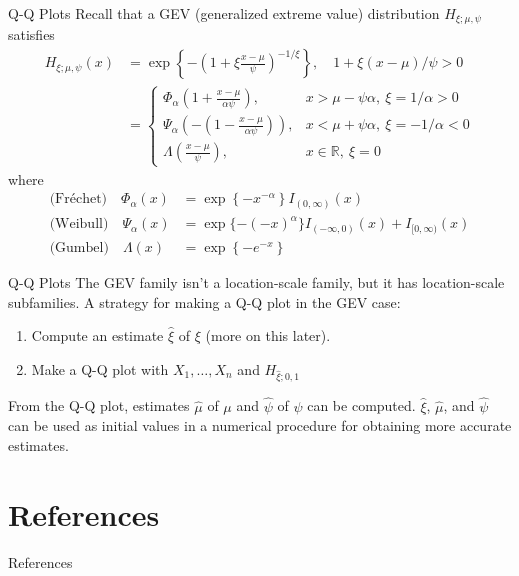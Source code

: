 \documentclass{beamer}
\begin{document}
\begin{frame}{Q-Q Plots}
    Recall that a GEV (generalized extreme value) distribution $H_{\xi; \mu, \psi}$ satisfies
    \begin{align*}
        H_{\xi; \mu, \psi}(x) &= \exp\left\{-\left(1 + \xi\frac{x - \mu}{\psi}\right)^{-1 / \xi}\right\}, \quad 1 + \xi(x - \mu) / \psi > 0 \\
        &=
        \begin{cases}
            \Phi_{\alpha}\left(1 + \frac{x - \mu}{\alpha\psi}\right), & x > \mu - \psi\alpha, \ \xi = 1 / \alpha > 0 \\
            \Psi_{\alpha}\left(-\left(1 - \frac{x - \mu}{\alpha\psi}\right)\right), & x < \mu + \psi\alpha, \ \xi = -1 / \alpha < 0 \\
            \Lambda\left(\frac{x - \mu}{\psi}\right), & x \in \mathbb{R}, \ \xi = 0
        \end{cases}
    \end{align*}
    where
    \begin{align*}
        \text{(Fr\'{e}chet)} \quad \Phi_{\alpha}(x) &= \exp\left\{-x^{-\alpha}\right\}I_{(0, \infty)}(x) \\
        \text{(Weibull)} \quad \Psi_{\alpha}(x) &= \exp\{-(-x)^{\alpha}\}I_{(-\infty, 0)}(x) + I_{[0, \infty)}(x) \\
        \text{(Gumbel)} \quad \Lambda(x) &= \exp\left\{-e^{-x}\right\}
    \end{align*}
\end{frame}

\begin{frame}{Q-Q Plots}
    The GEV family isn't a location-scale family, but it has location-scale subfamilies. A strategy for making a Q-Q plot in the GEV case:
    \begin{enumerate}
        \item Compute an estimate $\hat{\xi}$ of $\xi$ (more on this later).
        \item Make a Q-Q plot with $X_1, \ldots, X_n$ and $H_{\hat{\xi}; 0, 1}$
    \end{enumerate}
    From the Q-Q plot, estimates $\hat{\mu}$ of $\mu$ and $\hat{\psi}$ of $\psi$ can be computed. $\hat{\xi}$, $\hat{\mu}$, and $\hat{\psi}$ can be used as initial values in a numerical procedure for obtaining more accurate estimates.
\end{frame}

\section{References}

\begin{frame}{References}
    \nocite{*}
    \printbibliography
\end{frame}
\end{document}
